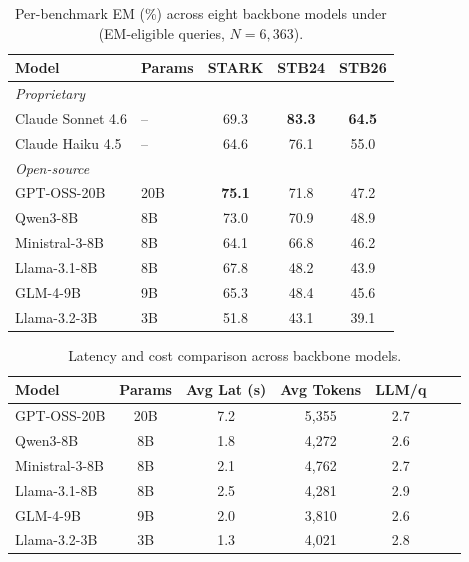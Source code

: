 \begin{table}[!htbp]
\centering
\caption{Per-benchmark EM (\%) across eight backbone models under \starname{} (EM-eligible queries, $N=6{,}363$).}
\label{tab:multi_model}
\small
\begin{tabular}{llccc}
\toprule
Model & Params & STARK & STB24 & STB26 \\
\midrule
\multicolumn{5}{l}{\emph{Proprietary}} \\
Claude Sonnet 4.6  & --  & 69.3          & \textbf{83.3} & \textbf{64.5} \\
Claude Haiku 4.5   & --  & 64.6          & 76.1          & 55.0 \\
\midrule
\multicolumn{5}{l}{\emph{Open-source}} \\
GPT-OSS-20B & 20B & \textbf{75.1} & 71.8          & 47.2 \\
Qwen3-8B           & 8B  & 73.0          & 70.9          & 48.9 \\
Ministral-3-8B     & 8B  & 64.1          & 66.8          & 46.2 \\
Llama-3.1-8B       & 8B  & 67.8          & 48.2          & 43.9 \\
GLM-4-9B           & 9B  & 65.3          & 48.4          & 45.6 \\
Llama-3.2-3B       & 3B  & 51.8          & 43.1          & 39.1 \\
\bottomrule
\end{tabular}
\end{table}

\begin{table}[!htbp]
\centering
\caption{Latency and cost comparison across backbone models.}
\label{tab:latency_models}
\small
\begin{tabular}{lcccccc}
\toprule
Model & Params & Avg Lat (s) & Avg Tokens & LLM/q \\
\midrule
GPT-OSS-20B     & 20B & 7.2 & 5{,}355 & 2.7 \\
Qwen3-8B        & 8B  & 1.8 & 4{,}272 & 2.6 \\
Ministral-3-8B  & 8B  & 2.1 & 4{,}762 & 2.7 \\
Llama-3.1-8B    & 8B  & 2.5 & 4{,}281 & 2.9 \\
GLM-4-9B        & 9B  & 2.0 & 3{,}810 & 2.6 \\
Llama-3.2-3B    & 3B  & 1.3 & 4{,}021 & 2.8 \\
\bottomrule
\end{tabular}
\end{table}


\FloatBarrier
